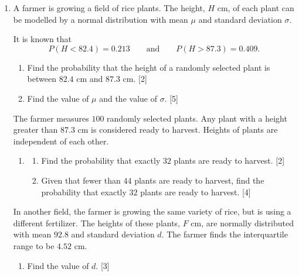 \documentclass[12pt, twoside]{article}
\begin{document}
\begin{enumerate}[itemsep=0.3cm]
\newpage

\item[2.] 

A farmer is growing a field of rice plants. The height, $H$ cm, of each
plant can be modelled by a normal distribution with mean $\mu$ and
standard deviation $\sigma$.

It is known that
\[
P(H<82.4)=0.213
\qquad\text{and}\qquad
P(H>87.3)=0.409.
\]

\begin{enumerate}[itemsep=0.16cm]
  \item Find the probability that the height of a randomly selected plant
  is between $82.4$ cm and $87.3$ cm. \hfill [2]
  \item Find the value of $\mu$ and the value of $\sigma$. \hfill [5]
\end{enumerate}

The farmer measures $100$ randomly selected plants. Any plant with a
height greater than $87.3$ cm is considered ready to harvest. Heights of
plants are independent of each other.

\begin{enumerate}[itemsep=0.16cm]
  \item[(c)] \begin{enumerate}[itemsep=0.08cm]
    \item[(i)] Find the probability that exactly $32$ plants are ready to
    harvest. \hfill [2]
    \item[(ii)] Given that fewer than $44$ plants are ready to harvest,
    find the probability that exactly $32$ plants are ready to harvest.
    \hfill [4]
  \end{enumerate}
\end{enumerate}

In another field, the farmer is growing the same variety of rice, but is
using a different fertilizer. The heights of these plants, $F$ cm, are
normally distributed with mean $92.8$ and standard deviation $d$. The
farmer finds the interquartile range to be $4.52$ cm.

\begin{enumerate}[itemsep=0.16cm]
  \item[(d)] Find the value of $d$. \hfill [3]
\end{enumerate}

\end{enumerate}
\end{document}

